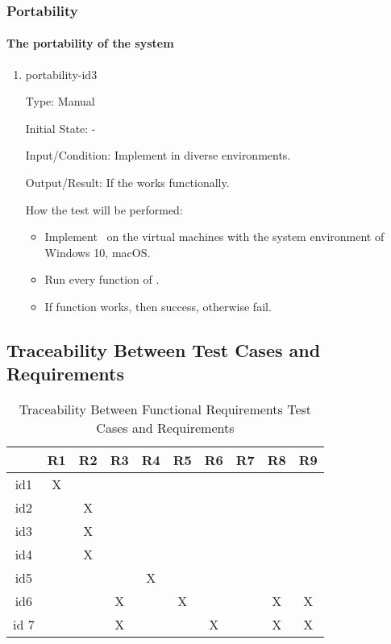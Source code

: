 \documentclass[12pt, titlepage]{article}
\begin{document}
\subsubsection{Portability} 
\paragraph{The portability of the system}
\begin{enumerate}

\item{portability-id3\\}

Type: Manual
					
Initial State: -
					
Input/Condition: Implement \progname in diverse environments.
					
Output/Result: If the \progname works functionally.
					
How the test will be performed:
\begin{itemize}
\item Implement \progname ~on the
virtual machines with the system environment of Windows 10, macOS.
\item Run every function of \progname.
\item If function works, then success, otherwise fail.
\end{itemize}
\end{enumerate}


\newpage
\subsection{Traceability Between Test Cases and Requirements}


\begin{table}[h!]
\centering
\begin{tabular}{|c|c|c|c|c|c|c|c|c|c|}
\hline        
	& R1& R2 & R3 &R4 & R5 &R6  &R7 &R8 &R9 \\
\hline
id1        & X &    &     &    &    &    &   &    &    \\ \hline
id2        &    & X &     &    &    &    &   &    &     \\ \hline
id3        &     & X &     &    &    &    &   &    &    \\ \hline
id4        &     & X &     &    &    &    &   &    &      \\ \hline
id5        &    &    &     & X &    &    &   &    &     \\  \hline
id6       &    &    & X &     & X  &    &    & X & X   \\ \hline
id 7      &    &    & X &    &    &  X  &    & X & X \\ \hline


\hline
\end{tabular}
\caption{Traceability Between Functional Requirements Test Cases and
Requirements}
\label{Table:trace}
\end{table}
\end{document}
